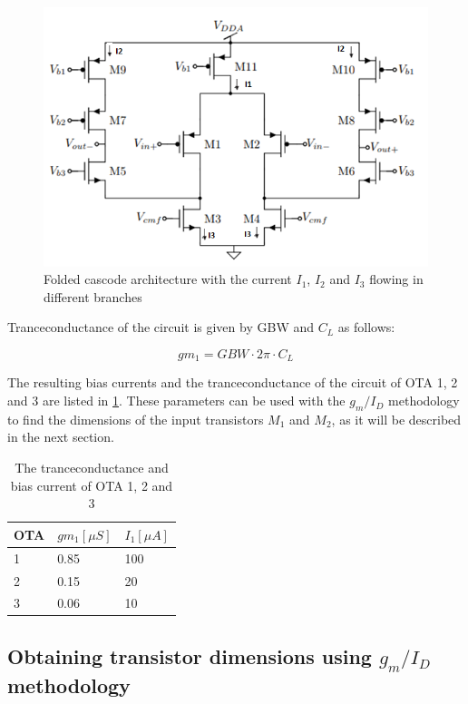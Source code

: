 \begin{figure}[h]
\centering
\includegraphics[scale = 0.8]{images/folded_cascode.png}
\caption{Folded cascode architecture with the current $I_1$, $I_2$ and $I_3$ flowing in different branches \cite{Grey}}
\label{fig:folded_ota_design}
\end{figure}

Tranceconductance of the circuit is given by GBW and $C_L$ as follows:

\begin{equation}
    gm_1 = GBW\cdot2\pi\cdot C_L
\end{equation}

The resulting bias currents and the tranceconductance of the circuit of OTA 1, 2 and 3 are listed in \ref{step_1}. These parameters can be used with the $g_m/I_D$ methodology to find the dimensions of the input transistors $M_1$ and $M_2$, as it will be described in the next section. 

\begin{table}[h]
\centering
\caption{The tranceconductance and bias current of OTA 1, 2 and 3}
\label{step_1}
\begin{tabular}{|l|l|l|}
\hline
OTA & $gm_1[\mu S]$ & $I_1[\mu A]$ \\ \hline
1   & 0.85  & 100  \\ \hline
2   & 0.15  & 20   \\ \hline
3   & 0.06   & 10   \\ \hline
\end{tabular}
\end{table}

\subsection{Obtaining transistor dimensions using $g_m/I_D$ methodology}


